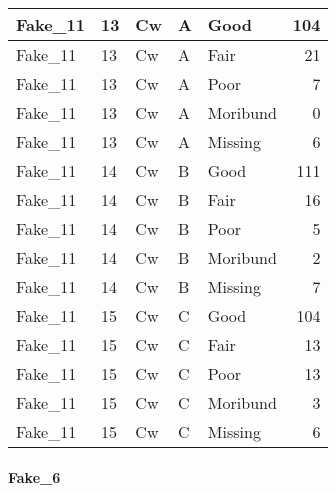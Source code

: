\documentclass[
]{article}
\begin{document}
\begin{tabular}{l|l|l|l|l|r}
\hline
Fake\_11 & 13 & Cw & A & Good & 104\\
\hline
Fake\_11 & 13 & Cw & A & Fair & 21\\
\hline
Fake\_11 & 13 & Cw & A & Poor & 7\\
\hline
Fake\_11 & 13 & Cw & A & Moribund & 0\\
\hline
Fake\_11 & 13 & Cw & A & Missing & 6\\
\hline
Fake\_11 & 14 & Cw & B & Good & 111\\
\hline
Fake\_11 & 14 & Cw & B & Fair & 16\\
\hline
Fake\_11 & 14 & Cw & B & Poor & 5\\
\hline
Fake\_11 & 14 & Cw & B & Moribund & 2\\
\hline
Fake\_11 & 14 & Cw & B & Missing & 7\\
\hline
Fake\_11 & 15 & Cw & C & Good & 104\\
\hline
Fake\_11 & 15 & Cw & C & Fair & 13\\
\hline
Fake\_11 & 15 & Cw & C & Poor & 13\\
\hline
Fake\_11 & 15 & Cw & C & Moribund & 3\\
\hline
Fake\_11 & 15 & Cw & C & Missing & 6\\
\hline
\end{tabular}

\hypertarget{fake_6-1}{%
\paragraph{Fake\_6}\label{fake_6-1}}
\end{document}
